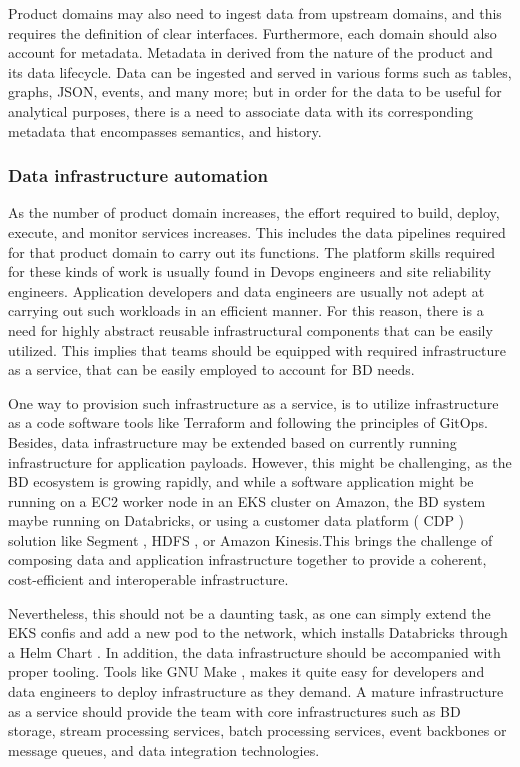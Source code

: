 \documentclass[review]{elsarticle}
\begin{document}
Product domains may also need to ingest data from upstream domains, and this requires the definition of clear interfaces. Furthermore, each domain should also account for metadata. Metadata in derived from the nature of the product and its data lifecycle. Data can be ingested and served in various forms such as tables, graphs, JSON, events, and many more; but in order for the data to be useful for analytical purposes, there is a need to associate data with its corresponding metadata that encompasses semantics, and history.

\subsubsection{Data infrastructure automation}

As the number of product domain increases, the effort required to build, deploy, execute, and monitor services increases. This includes the data pipelines required for that product domain to carry out its functions. The platform skills required for these kinds of work is usually found in Devops engineers and site reliability engineers. Application developers and data engineers are usually not adept at carrying out such workloads in an efficient manner. For this reason, there is a need for highly abstract reusable infrastructural components that can be easily utilized. This implies that teams should be equipped with required infrastructure as a service, that can be easily employed to account for BD needs.

One way to provision such infrastructure as a service, is to utilize infrastructure as a code software tools like Terraform \cite{Terraform} and following the principles of GitOps. Besides, data infrastructure may be extended based on currently running infrastructure for application payloads. However, this might be challenging, as the BD ecosystem is growing rapidly, and while a software application might be running on a EC2 worker node in an EKS cluster on Amazon, the BD system maybe running on Databricks, or using a customer data platform ( CDP ) solution like Segment \cite{Segment}, HDFS \cite{HDFS}, or Amazon Kinesis.This brings the challenge of composing data and application infrastructure together to provide a coherent, cost-efficient and interoperable infrastructure.

Nevertheless, this should not be a daunting task, as one can simply extend the EKS confis and add a new pod to the network, which installs Databricks through a Helm Chart \cite{Helm}. In addition, the data infrastructure should be accompanied with proper tooling. Tools like GNU Make \cite{Make}, makes it quite easy for developers and data engineers to deploy infrastructure as they demand.
A mature infrastructure as a service should provide the team with core infrastructures such as BD storage, stream processing services, batch processing services, event backbones or message queues, and data integration technologies.
\end{document}
